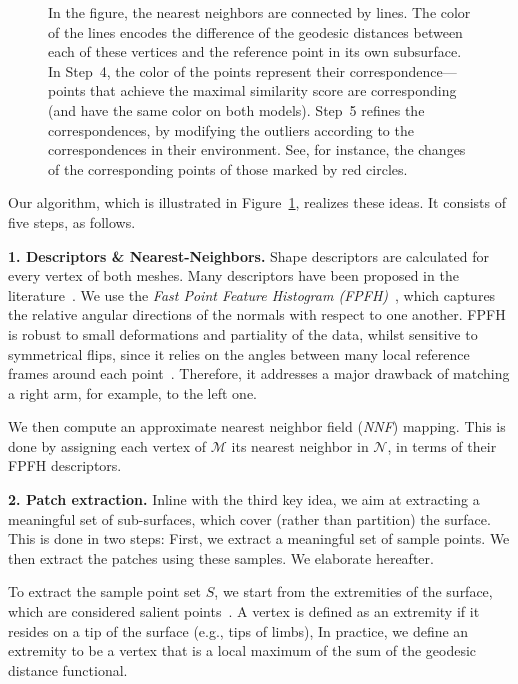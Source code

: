 \begin{figure}[htb]
{In the figure, the nearest neighbors are connected by lines.
The color of the lines encodes the difference of the geodesic distances between each of these vertices and the reference point in its own subsurface.
In Step~4, the color of the points represent their correspondence--- points that achieve the maximal similarity score are corresponding (and have the same color on both models).
Step~5 refines the correspondences, by modifying the outliers according to the correspondences in their environment.
See, for instance, the changes of the corresponding points of those marked by red circles.
	}
	\label{fig:overview}
\end{figure}

Our algorithm, which is illustrated in Figure~\ref{fig:overview}, realizes these ideas. It consists of five steps, as follows.

\vspace{0.1in}
\noindent
\textbf{1. Descriptors \& Nearest-Neighbors.}
Shape descriptors are calculated for every vertex of both meshes.
Many descriptors have been proposed in the literature~\cite{rusu2008towards,tombari2010unique,Sun:2009:CPI:1735603.1735621}.
We use the {\em Fast Point Feature Histogram (FPFH)}~\cite{rusu2009fast}, which captures the relative angular directions of the normals with respect to one another.
FPFH is robust to small deformations and partiality of the data, whilst sensitive to symmetrical flips, since it relies on the angles between many local reference frames around each point~\cite{shtrom2013saliency}.
Therefore, it addresses a major drawback of matching a right arm, for example, to the left one.

%
We then compute an approximate nearest neighbor field (\textit{NNF}) mapping.
This is done by assigning each vertex of $\mathcal{M}$ its nearest neighbor in $\mathcal{N}$, in terms of their FPFH descriptors.

\vspace{0.1in}
\noindent
{\textbf {2. Patch extraction.}}
Inline with the third key idea, we aim at extracting a meaningful set of sub-surfaces, which cover (rather than partition) the surface.
This is done in two steps:
First, we extract a meaningful set of sample points.
We then extract the patches using these samples.
We elaborate hereafter.

To extract the sample point set $S$, we start from the extremities of the surface, which are considered salient points~\cite{katz2005mesh}.
A vertex is defined as an extremity if it  resides on a tip of the surface (e.g.,  tips of limbs),
In practice, we define an extremity to be a vertex that is a local maximum of the sum of the geodesic distance functional.

